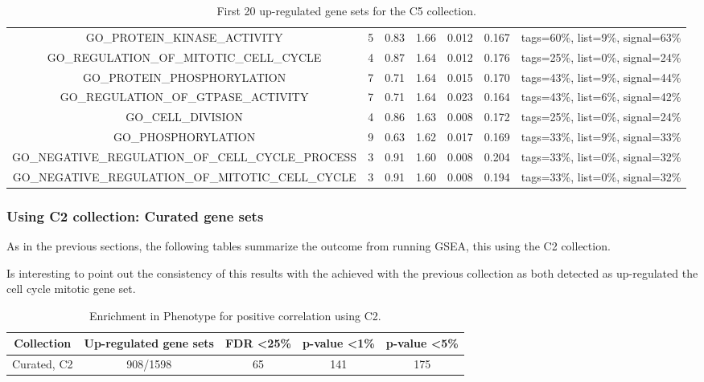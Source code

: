 \begin{table}[h!]
{\begin{tabular}{ccccccc}
    GO\_PROTEIN\_KINASE\_ACTIVITY                                & 5    & 0.83 & 1.66 & 0.012     & 0.167     & tags=60\%, list=9\%, signal=63\%  \\
    GO\_REGULATION\_OF\_MITOTIC\_CELL\_CYCLE                     & 4    & 0.87 & 1.64 & 0.012     & 0.176     & tags=25\%, list=0\%, signal=24\%  \\
    GO\_PROTEIN\_PHOSPHORYLATION                                 & 7    & 0.71 & 1.64 & 0.015     & 0.170     & tags=43\%, list=9\%, signal=44\%  \\
    GO\_REGULATION\_OF\_GTPASE\_ACTIVITY                         & 7    & 0.71 & 1.64 & 0.023     & 0.164     & tags=43\%, list=6\%, signal=42\%  \\
    GO\_CELL\_DIVISION                                           & 4    & 0.86 & 1.63 & 0.008     & 0.172     & tags=25\%, list=0\%, signal=24\%  \\
    GO\_PHOSPHORYLATION                                          & 9    & 0.63 & 1.62 & 0.017     & 0.169     & tags=33\%, list=9\%, signal=33\%  \\
    GO\_NEGATIVE\_REGULATION\_OF\_CELL\_CYCLE\_PROCESS           & 3    & 0.91 & 1.60 & 0.008     & 0.204     & tags=33\%, list=0\%, signal=32\%  \\
    GO\_NEGATIVE\_REGULATION\_OF\_MITOTIC\_CELL\_CYCLE           & 3    & 0.91 & 1.60 & 0.008     & 0.194     & tags=33\%, list=0\%, signal=32\%  \\ \hline
    \end{tabular}%
    }
    \caption{First 20 up-regulated gene sets for the C5 collection.}
    \label{detailed_pos_c5}
    \end{table}

\newpage
\subsubsection{Using C2 collection: Curated gene sets}

As in the previous sections, the following tables summarize the outcome from running GSEA, this using the C2 collection.

Is interesting to point out the consistency of this results with the achieved with the previous collection as both detected as up-regulated the cell cycle mitotic gene set.

\begin{table}[h!]
    \centering
    \begin{tabular}{ccccc}
    \hline
    Collection      & Up-regulated gene sets & FDR \textless 25\% & p-value \textless 1\% & p-value \textless 5\% \\ \hline
    Curated, C2     & 908/1598               & 65                                & 141                                  & 175                                  \\ \hline
    \end{tabular}
    \caption{Enrichment in Phenotype for positive correlation using C2.}
    \label{enr_ph_positive_c2}
    \end{table}

